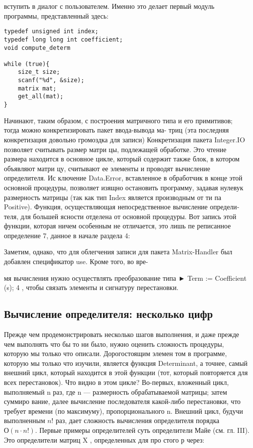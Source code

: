 вступить в диалог с пользователем. Именно это делает первый модуль
программы, представленный здесь:

\begin{lstlisting}
typedef unsigned int index;
typedef long long int coefficient;
void compute_determ

while (true){
	size_t size;
	scanf("%d", &size);
	matrix mat;
	get_all(mat);
}
\end{lstlisting}

Начинают, таким образом, с построения матричного типа и его
примитивов; тогда можно конкретизировать пакет ввода-вывода ма-
\newpage
триц (эта последняя конкретизация довольно громоздка для записи)
Конкретизация пакета Integer.IO позволяет считывать размер матри­
цы, подлежащей обработке. Это чтение размера находится в основное
цикле, который содержит также блок, в котором объявляют матри­
цу, считывают ее элементы и проводят вычисление определителя. Ис­
ключение Data.Error, вставленное в обработчик в конце этой основной
процедуры, позволяет изящно остановить программу, задавая нулевук
размерность матрицы (так как тип Index является производным от ти­
па Positive).
Функция, осуществляющая непосредственное вычисление определи­
теля, для большей ясности отделена от основной процедуры. Вот запись
этой функции, которая ничем особенным не отличается, это лишь пе­
реписанное определение 7, данное в начале раздела 4:


Заметим, однако, что для облегчения записи для пакета
Matrix-Handler был добавлен спецификатор use. Кроме того, во вре-
\newpage

мя вычисления нужно осуществлять преобразование типа ► Term :=
Coefficient (s); 4 , чтобы связать элементы и сигнатуру перестановки.

\subsection{Вычисление определителя: несколько цифр}

Прежде чем продемонстрировать несколько шагов выполнения, и даже
прежде чем выполнять что бы то ни было, нужно оценить сложность
процедуры, которую мы только что описали. Дорогостоящим элемен­
том в программе, которую мы только что изучили, является функция
Determinant, а точнее, самый внешний цикл, который находится в этой
функции (тот, который повторяется для всех перестановок).
Что видно в этом цикле? Во-первых, вложенный цикл, выполняемый
n раз, где n — размерность обрабатываемой матрицы; затем суммиро­
вание, далее вычисление последователя какой-либо перестановки, что
требует времени (по максимуму), пропорционального n. Внешний цикл,
будучи выполненным $n!$ раз, дает сложность вычисления определителя
порядка $О(n \cdot n!)$. Первые примеры определителей суть определители
Майе (см. гл. III). Это определители матриц X , определенных для про­
стого р через:

